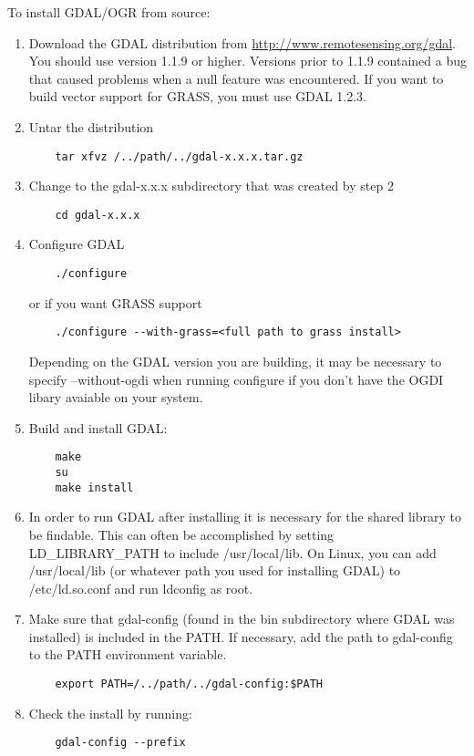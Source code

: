 \documentclass[a4paper,10pt]{article}
\begin{document}
  To install GDAL/OGR from source:
  \begin{enumerate}
  \item Download the GDAL distribution from \url{http://www.remotesensing.org/gdal}. You should use version 1.1.9 or higher. Versions prior to 1.1.9 contained a bug that caused problems when a null feature was encountered. If you want to build vector support for GRASS, you must use GDAL 1.2.3.

  \item Untar the distribution 
  \begin{verbatim}
    tar xfvz /../path/../gdal-x.x.x.tar.gz
  \end{verbatim}

  \item Change to the gdal-x.x.x subdirectory that was created by step 2
  \begin{verbatim}
    cd gdal-x.x.x
  \end{verbatim}

  \item Configure GDAL
  \begin{verbatim}
    ./configure 
  \end{verbatim}
  or if you want GRASS support
  \begin{verbatim}
    ./configure --with-grass=<full path to grass install>
  \end{verbatim}
  Depending on the GDAL version you are building, it may be necessary to specify --without-ogdi when running configure if you don't have the OGDI libary avaiable on your system.

  \item Build and install GDAL:
  \begin{verbatim}
    make
    su
    make install
  \end{verbatim}

  \item In order to run GDAL after installing it is necessary for the shared
  library to be findable. This can often be accomplished by setting
  LD\_LIBRARY\_PATH to include /usr/local/lib. On Linux, you can add
  /usr/local/lib (or whatever path you used for installing GDAL) to
  /etc/ld.so.conf and run ldconfig as root.

  \item Make sure that gdal-config (found in the bin subdirectory where GDAL was installed) is included in the PATH. If necessary, add the path to gdal-config to the PATH environment variable.
  \begin{verbatim}
    export PATH=/../path/../gdal-config:$PATH
  \end{verbatim}

  \item Check the install by running:
  \begin{verbatim}
    gdal-config --prefix
  \end{verbatim}

  \end{enumerate}
\end{document}
